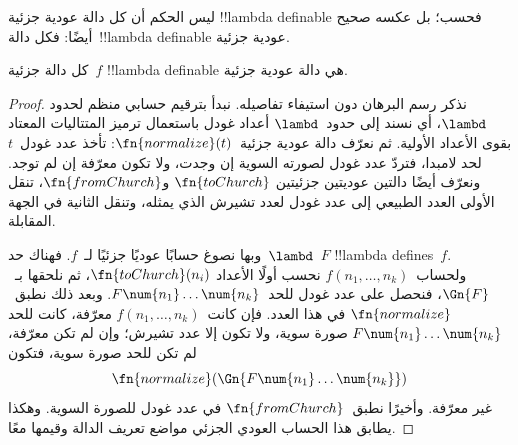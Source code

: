 \documentclass[../../../include/open-logic-section]{subfiles}
\begin{document}

ليس الحكم أن كل دالة عودية جزئية !!{lambda definable} فحسب؛ بل عكسه
صحيح أيضًا: فكل دالة~!!{lambda definable} عودية جزئية.

\begin{thm}
   كل دالة جزئية~$f$
  !!{lambda definable} هي دالة عودية جزئية.
\end{thm}

\begin{proof}
  نذكر رسم البرهان دون استيفاء تفاصيله. نبدأ بترقيم حسابي منظم لحدود
  $\lambd$، أي نسند إلى حدود~$\lambd$ أعداد غودل باستعمال ترميز المتتاليات المعتاد
  بقوى الأعداد الأولية. ثم نعرّف دالة عودية جزئية~$\fn{normalize}(t)$:
  تأخذ عدد غودل~$t$ لحد لامبدا، فتردّ عدد غودل لصورته السوية إن وجدت،
  ولا تكون معرّفة إن لم توجد. ونعرّف أيضًا دالتين عوديتين جزئيتين
  $\fn{toChurch}$ و$\fn{fromChurch}$، تنقل الأولى العدد الطبيعي إلى
  عدد غودل لعدد تشيرش الذي يمثله، وتنقل الثانية في الجهة المقابلة.

  وبها نصوغ حسابًا عوديًا جزئيًا لـ~$f$. فهناك حد~$\lambd$~$F$
  !!{lambda define}s~$f$. ولحساب~$f(n_1, \dots, n_k)$ نحسب أولًا الأعداد
  $\fn{toChurch}(n_i)$، ثم نلحقها بـ~$\Gn{F}$، فنحصل على عدد غودل
  للحد~$F \num{n_1}\dots\num{n_k}$. وبعد ذلك نطبق~$\fn{normalize}$
  في هذا العدد. فإن كانت~$f(n_1, \dots, n_k)$ معرّفة، كانت للحد
  $F \num{n_1}\dots\num{n_k}$ صورة سوية، ولا تكون إلا عدد تشيرش؛
  وإن لم تكن معرّفة، لم تكن للحد صورة سوية، فتكون
  \[\fn{normalize}(\Gn{F\num{n_1}\dots\num{n_k}})\]
  غير معرّفة. وأخيرًا نطبق~$\fn{fromChurch}$ في عدد غودل للصورة
  السوية. وهكذا يطابق هذا الحساب العودي الجزئي مواضع تعريف الدالة
  وقيمها معًا.
\end{proof}
\end{document}
